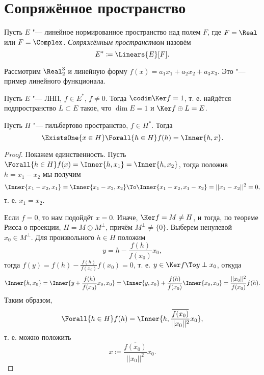 \documentclass[main]{subfiles}
\begin{document}
\section{Сопряжённое пространство} %

\begin{definition}
  Пусть \( E \) "--- линейное нормированное пространство
  над полем \( F \),
  где \( F = \Real \) или \( F = \Complex \).
  \emph{Сопряжённым пространством} назовём
  \[ E^* \coloneqq \Linears{E}[F]. \]
\end{definition}

\begin{example}
  Рассмотрим \( \Real_2^3 \) и линейную форму
  \( f(x) = a_1 x_1 + a_2 x_2 + a_3 x_3 \).
  Это "--- пример линейного функционала.
\end{example}

\begin{exercise}
  Пусть \( E \) "--- ЛНП, \( f \in E^* \), \( f \ne 0 \).
  Тогда \( \codim \Ker f = 1 \),
  т. е. найдётся подпространство \( L \subset E \)
  такое, что \( \dim E = 1 \) и \( \Ker f \oplus L = E \).
\end{exercise}

\begin{theorem}
  Пусть \( H \) "--- гильбертово пространство,
  \( f \in H^* \). Тогда
  \[ \ExistsOne{x \in H} \Forall{h \in H} f(h) = \Inner{h, x}. \]
\end{theorem}
\begin{proof}
  Покажем единственность.
  Пусть
  \( \Forall{h \in H} f(x) = \Inner{h, x_1} = \Inner{h, x_2} \),
  тогда положив \( h = x_1 - x_2 \)
  мы получим
  \[
    \Inner{x_1 - x_2, x_1} =
    \Inner{x_1 - x_2, x_2} \To
    \Inner{x_1 - x_2, x_1 - x_2} = ||x_1 - x_2||^2 = 0,
  \]
  т. е. \( x_1 = x_2 \).

  Если \( f = 0 \), то нам подойдёт \( x = 0 \).
  Иначе, \( \Ker f = M \ne H \),
  и тогда, по теореме Рисса о проекции,
  \( H = M \oplus M^\perp \),
  причём \( M^\perp \ne \{ 0 \} \).
  Выберем ненулевой \( x_0 \in M^\perp \). Для произвольного
  \( h \in H \) положим
  \[
    y = h - \frac{f(h)}{f(x_0)} x_0,
  \]
  тогда \( f(y) = f(h) - \frac{f(h)}{f(x_0)} f(x_0) = 0 \),
  т. е. \( y \in \Ker f \To y \perp x_0 \),
  откуда
  \[
    \Inner{h, x_0} = \Inner{y + \frac{f(h)}{f(x_0)} x_0, x_0} =
    \Inner{y, x_0} + \frac{f(h)}{f(x_0)} \Inner{x_0, x_0} =
    \frac{||x_0||^2}{f(x_0)} f(h).
  \]
  Таким образом,
  \[
    \Forall{h \in H} f(h) = \Inner{h, \frac{\overline{f(x_0)}}{||x_0||^2} x_0},
  \]
  т. е. можно положить
  \[ x \coloneqq \frac{\overline{f(x_0)}}{||x_0||^2} x_0. \]
\end{proof}
\end{document}
